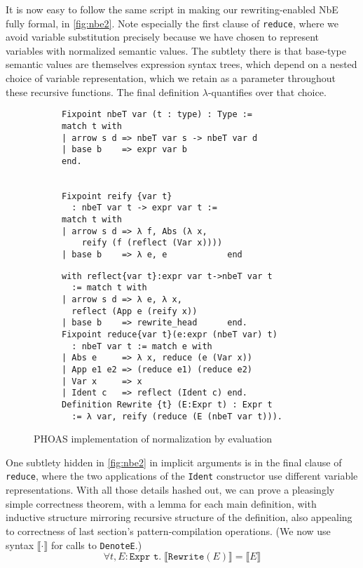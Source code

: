 \documentclass[a4paper,USenglish,cleveref,autoref,thm-restate]{lipics-v2021}
\begin{document}
It is now easy to follow the same script in making our rewriting-enabled NbE fully formal, in \autoref{fig:nbe2}.
Note especially the first clause of \texttt{reduce}, where we avoid variable substitution precisely because we have chosen to represent variables with normalized semantic values.
The subtlety there is that base-type semantic values are themselves expression syntax trees, which depend on a nested choice of variable representation, which we retain as a parameter throughout these recursive functions.
The final definition $\lambda$-quantifies over that choice.

\begin{figure}
  \begin{subfigure}[b]{0.5\textwidth}
    \begin{verbatim}
Fixpoint nbeT var (t : type) : Type :=
match t with
| arrow s d => nbeT var s -> nbeT var d
| base b    => expr var b
end.


Fixpoint reify {var t}
  : nbeT var t -> expr var t :=
match t with
| arrow s d => λ f, Abs (λ x,
    reify (f (reflect (Var x))))
| base b    => λ e, e            end
    \end{verbatim}
  \end{subfigure}
  \begin{subfigure}[b]{0.5\textwidth}
    \begin{verbatim}
with reflect{var t}:expr var t->nbeT var t
  := match t with
| arrow s d => λ e, λ x,
  reflect (App e (reify x))
| base b    => rewrite_head      end.
Fixpoint reduce{var t}(e:expr (nbeT var) t)
  : nbeT var t := match e with
| Abs e     => λ x, reduce (e (Var x))
| App e1 e2 => (reduce e1) (reduce e2)
| Var x     => x
| Ident c   => reflect (Ident c) end.
Definition Rewrite {t} (E:Expr t) : Expr t
  := λ var, reify (reduce (E (nbeT var t))).
    \end{verbatim}
  \end{subfigure}
  \caption{\label{fig:nbe2}PHOAS implementation of normalization by evaluation}
\end{figure}

One subtlety hidden in \autoref{fig:nbe2} in implicit arguments is in the final clause of \texttt{reduce}, where the two applications of the \texttt{Ident} constructor use different variable representations.
With all those details hashed out, we can prove a pleasingly simple correctness theorem, with a lemma for each main definition, with inductive structure mirroring recursive structure of the definition, also appealing to correctness of last section's pattern-compilation operations.
(We now use syntax $\llbracket \cdot \rrbracket$ for calls to \texttt{DenoteE}.)
$$\forall t, E : \texttt{Expr t}. \; \llbracket \texttt{Rewrite}(E) \rrbracket = \llbracket E \rrbracket$$
\end{document}
